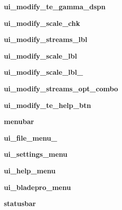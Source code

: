 \begin{DoxyCompactItemize}
\item 
\hypertarget{a00077_a4ca63b2a637cf38364b19f24c8285b50}{}\label{a00077_a4ca63b2a637cf38364b19f24c8285b50} 
{\bfseries ui\+\_\+modify\+\_\+te\+\_\+gamma\+\_\+dspn}
\item 
\hypertarget{a00077_a8223e458d886d632e1e32eebe1660ccd}{}\label{a00077_a8223e458d886d632e1e32eebe1660ccd} 
{\bfseries ui\+\_\+modify\+\_\+scale\+\_\+chk}
\item 
\hypertarget{a00077_ad2a466e412f8814a818109b3da354bfe}{}\label{a00077_ad2a466e412f8814a818109b3da354bfe} 
{\bfseries ui\+\_\+modify\+\_\+streams\+\_\+lbl}
\item 
\hypertarget{a00077_a5479dc39259c17b5db0877712f530e02}{}\label{a00077_a5479dc39259c17b5db0877712f530e02} 
{\bfseries ui\+\_\+modify\+\_\+scale\+\_\+lbl}
\item 
\hypertarget{a00077_a92fe24b218066d90fc276b44b16d0512}{}\label{a00077_a92fe24b218066d90fc276b44b16d0512} 
{\bfseries ui\+\_\+modify\+\_\+scale\+\_\+lbl\+\_}
\item 
\hypertarget{a00077_a0f38b3177af34fbc4c1d75de6572ab57}{}\label{a00077_a0f38b3177af34fbc4c1d75de6572ab57} 
{\bfseries ui\+\_\+modify\+\_\+streams\+\_\+opt\+\_\+combo}
\item 
\hypertarget{a00077_a19f92f3e51261adf29b1f0082cd54d3c}{}\label{a00077_a19f92f3e51261adf29b1f0082cd54d3c} 
{\bfseries ui\+\_\+modify\+\_\+te\+\_\+help\+\_\+btn}
\item 
\hypertarget{a00077_a798cd0741b801dadeed104d005b5f175}{}\label{a00077_a798cd0741b801dadeed104d005b5f175} 
{\bfseries menubar}
\item 
\hypertarget{a00077_a740ccb90eb10230354d8eaefa8b0370f}{}\label{a00077_a740ccb90eb10230354d8eaefa8b0370f} 
{\bfseries ui\+\_\+file\+\_\+menu\+\_\+}
\item 
\hypertarget{a00077_a487ed7e13e1d89fb7de06543d9148794}{}\label{a00077_a487ed7e13e1d89fb7de06543d9148794} 
{\bfseries ui\+\_\+settings\+\_\+menu}
\item 
\hypertarget{a00077_abcdec0fbee6392eec333564f58dcf14c}{}\label{a00077_abcdec0fbee6392eec333564f58dcf14c} 
{\bfseries ui\+\_\+help\+\_\+menu}
\item 
\hypertarget{a00077_ac514400aee7c0639a535f14d4966bd23}{}\label{a00077_ac514400aee7c0639a535f14d4966bd23} 
{\bfseries ui\+\_\+bladepro\+\_\+menu}
\item 
\hypertarget{a00077_a0333719e7851f78d90e68e2c94b7ab6c}{}\label{a00077_a0333719e7851f78d90e68e2c94b7ab6c} 
{\bfseries statusbar}
\item 
\hypertarget{a00077_a2e4dd6cf3c5c6f7a6a5b9d1aa3b74243}{}\label{a00077_a2e4dd6cf3c5c6f7a6a5b9d1aa3b74243} 

\end{DoxyCompactItemize}
